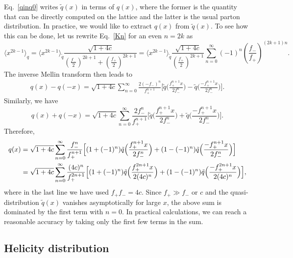 Eq.~\ref{qinq0} writes $\tilde q(x)$ in terms of $q(x)$, where the former is the quantity that can be directly computed on the lattice and the latter is the usual parton distribution. In practice, we would like to extract $q(x)$ from $\tilde q(x)$. To see how this can be done, let us rewrite Eq.~\ref{Kn} for an even $n=2k$ as
%
\begin{equation}\label{momentinverserel}
\langle x^{2k-1}\rangle_q=\langle x^{2k-1}\rangle_{\tilde q}\frac{\sqrt{1+4c}}{\left(\frac{f_-}{2}\right)^{2k+1}+\left(\frac{f_+}{2}\right)^{2k+1}}=\langle x^{2k-1}\rangle_{\tilde q}\frac{\sqrt{1+4c}}{\left(\frac{f_+}{2}\right)^{2k+1}}\sum_{n=0}^\infty (-1)^n\left(\frac{f_-}{f_+}\right)^{(2k+1)n}.
\end{equation}
%
The inverse Mellin transform then leads to
%
\begin{align}
q(x)-q(-x)=\sqrt{1+4c}\sum_{n=0}^\infty \frac{2(-f_-)^n}{f_+^{n+1}}\Big[\tilde q\Big(\frac{f_+^{n+1}x}{2f_-^n}\Big)-\tilde q\Big(\frac{-f_+^{n+1}x}{2f_-^n}\Big)\Big].
\end{align}
%
Similarly, we have
%
\begin{equation}
q(x)+q(-x)=\sqrt{1+4c}\sum_{n=0}^\infty \frac{2 f_-^n}{f_+^{n+1}}\Big[\tilde q\Big(\frac{f_+^{n+1}x}{2f_-^n}\Big)+\tilde q\Big(\frac{-f_+^{n+1}x}{2f_-^n}\Big)\Big].
\end{equation}
%
Therefore,
%
\begin{align}
q(x)&=\sqrt{1+4c}\sum_{n=0}^\infty \frac{f_-^n}{f_+^{n+1}}\Big[(1+(-1)^n)\tilde q\Big(\frac{f_+^{n+1}x}{2f_-^n}\Big)+(1-(-1)^n)\tilde q\Big(\frac{-f_+^{n+1}x}{2f_-^n}\Big)\Big]\nonumber\\
&=\sqrt{1+4c}\sum_{n=0}^\infty \frac{(4c)^n}{f_+^{2n+1}}\Big[(1+(-1)^n)\tilde q\Big(\frac{f_+^{2n+1}x}{2(4c)^n}\Big)+(1-(-1)^n)\tilde q\Big(\frac{-f_+^{2n+1}x}{2(4c)^n}\Big)\Big],
\end{align}
%
where in the last line we have used $f_+ f_-=4c$. Since $f_+\gg f_-$ or $c$ and the quasi-distribution $\tilde q(x)$ vanishes asymptotically for large $x$, the above sum is dominated by the first term with $n=0$. In practical calculations, we can reach a reasonable accuracy by taking only the first few terms in the sum.

\subsection {Helicity distribution}

